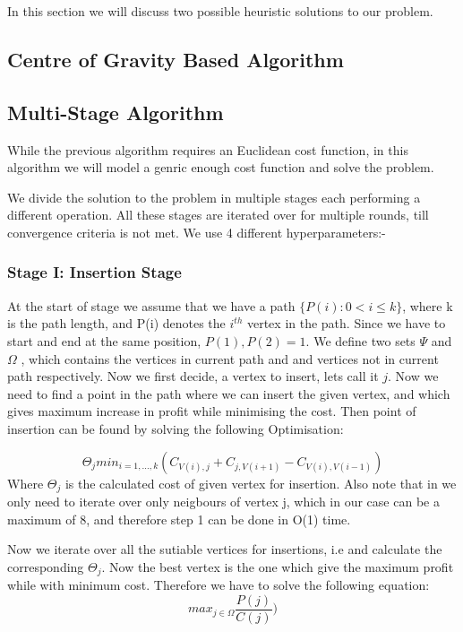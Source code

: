 \documentclass{article}
\begin{document}
In this section we will discuss two possible heuristic solutions to our problem. 

\subsection{Centre of Gravity Based Algorithm}


\subsection{Multi-Stage Algorithm}

While the previous algorithm requires an Euclidean cost function, in this algorithm we will model a genric enough cost function and solve the problem.

We divide the solution to the problem in multiple stages each performing a different operation. All these stages are iterated over for multiple rounds, till convergence criteria is not met.
We use 4 different hyperparameters:- %

\subsubsection{Stage I: Insertion Stage}

At the start of stage we assume that we have a path $\{P(i) : 0<i \leq k\}$, where k is the path length, and P(i) denotes the $i^{th}$ vertex in the path.
Since we have to start and end at the same position,
$P(1),P(2) = 1$.
We define two sets $\Psi$ and $\Omega$
 , which contains the vertices in current path and and vertices not in current path respectively.
Now we first decide, a vertex to insert, lets call it $j$. Now we need to find a point in the path where we can insert the given vertex, and which gives maximum increase in profit while minimising the cost.
Then point of insertion can be found by solving the following Optimisation:

\begin{equation} \label{eq2}
   \Theta_{j} min_{i = 1,\dots,k} ( C_{V(i),j} + C_{j,V(i+1)} - C_{V(i),V(i-1)} )
\end{equation}
Where $\Theta_{j}$ is the calculated cost of given vertex for insertion.
Also note that in  we only need to iterate over only neigbours of vertex j, which in our case can be a maximum of 8, and therefore step 1 can be done in O(1) time.

Now we iterate over all the sutiable vertices for insertions, i.e and calculate the corresponding
$\Theta_{j}$. Now the best vertex is the one which give the maximum profit while with minimum cost. 
Therefore we have to solve the following equation:
\begin{equation} \label{eq3}
    max_{j \in \Omega} \frac{P(j)}{C(j)} )
\end{equation}
\end{document}
